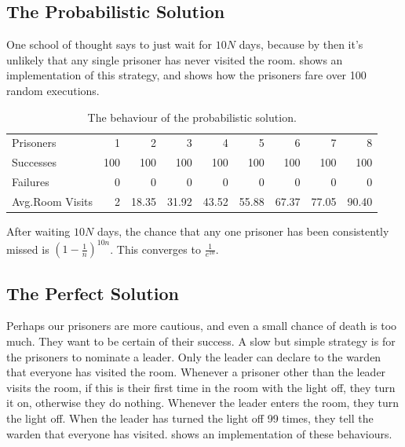 \subsection{The Probabilistic Solution}

One school of thought says to just wait for $10 N$ days, because by
then it's unlikely that any single prisoner has never visited the
room.   shows an implementation of this strategy,
and  shows how the prisoners fare over 100 random
executions.

\begin{table}
  \centering
  \begin{tabular}{l|rrrrrrrr} \toprule
    Prisoners          &   1 &   2    &   3    &   4    &   5    &   6    &   7    &   8 \\
    Successes          & 100 & 100    & 100    & 100    & 100    & 100    & 100    & 100 \\
    Failures           &   0 &   0    &   0    &   0    &   0    &   0    &   0    &   0 \\
    Avg.\@ Room Visits &   2 &  18.35 &  31.92 &  43.52 &  55.88 &  67.37 &  77.05 &  90.40 \\ \bottomrule
  \end{tabular}
  \caption{The behaviour of the probabilistic solution.}\label{tbl:100rand}
\end{table}

After waiting $10 N$ days, the chance that any one prisoner has been
consistently missed is $\left(1 - \frac{1}{n}\right)^{10n}$.  This
converges to $\frac{1}{e^{10}}$.

\subsection{The Perfect Solution}

Perhaps our prisoners are more cautious, and even a small chance of
death is too much.  They want to be certain of their success.  A slow
but simple strategy is for the prisoners to nominate a leader.  Only
the leader can declare to the warden that everyone has visited the
room.  Whenever a prisoner other than the leader visits the room, if
this is their first time in the room with the light off, they turn it
on, otherwise they do nothing.  Whenever the leader enters the room,
they turn the light off.  When the leader has turned the light off 99
times, they tell the warden that everyone has visited.
 shows an implementation of these behaviours.

